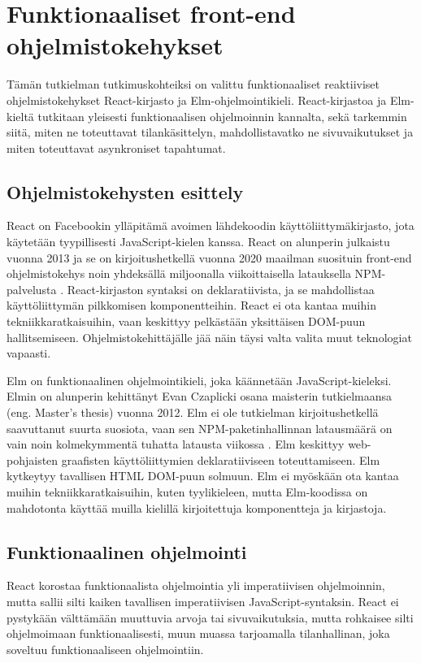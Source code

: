 \chapter{Funktionaaliset front-end ohjelmistokehykset}
Tämän tutkielman tutkimuskohteiksi on valittu funktionaaliset reaktiiviset ohjelmistokehykset React-kirjasto ja
Elm-ohjelmointikieli. React-kirjastoa ja Elm-kieltä tutkitaan yleisesti funktionaalisen ohjelmoinnin kannalta, sekä
tarkemmin siitä, miten ne toteuttavat tilankäsittelyn, mahdollistavatko ne sivuvaikutukset ja miten toteuttavat
asynkroniset tapahtumat.

\section{Ohjelmistokehysten esittely}
React on Facebookin ylläpitämä avoimen lähdekoodin käyttöliittymäkirjasto, jota käytetään tyypillisesti
JavaScript-kielen kanssa. React on alunperin julkaistu vuonna 2013 ja se on kirjoitushetkellä vuonna 2020 maailman
suosituin front-end ohjelmistokehys noin yhdeksällä miljoonalla viikoittaisella latauksella NPM-palvelusta 
\cite{npmtrends}. React-kirjaston syntaksi on deklaratiivista, ja se mahdollistaa käyttöliittymän pilkkomisen
komponentteihin. React ei ota kantaa muihin tekniikkaratkaisuihin, vaan keskittyy pelkästään yksittäisen DOM-puun
hallitsemiseen. Ohjelmistokehittäjälle jää näin täysi valta valita muut teknologiat vapaasti. \cite{reactjs}

Elm on funktionaalinen ohjelmointikieli, joka käännetään JavaScript-kieleksi. Elmin on alunperin kehittänyt Evan
Czaplicki osana maisterin tutkielmaansa (eng. Master's thesis) vuonna 2012. Elm ei ole tutkielman kirjoitushetkellä
saavuttanut suurta suosiota, vaan sen NPM-paketinhallinnan latausmäärä on vain noin kolmekymmentä tuhatta latausta
viikossa \cite{npmtrends}. Elm keskittyy web-pohjaisten graafisten käyttöliittymien deklaratiiviseen toteuttamiseen. Elm
kytkeytyy tavallisen HTML DOM-puun solmuun. Elm ei myöskään ota kantaa muihin tekniikkaratkaisuihin, kuten tyylikieleen,
mutta Elm-koodissa on mahdotonta käyttää muilla kielillä kirjoitettuja komponentteja ja kirjastoja. \cite{elmlang}

\section{Funktionaalinen ohjelmointi}
React korostaa funktionaalista ohjelmointia yli imperatiivisen ohjelmoinnin, mutta sallii silti kaiken tavallisen
imperatiivisen JavaScript-syntaksin. React ei pystykään välttämään muuttuvia arvoja tai sivuvaikutuksia, mutta rohkaisee
silti ohjelmoimaan funktionaalisesti, muun muassa tarjoamalla tilanhallinan, joka soveltuu funktionaaliseen
ohjelmointiin. \cite{reactjs}

